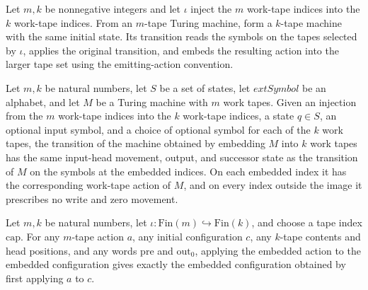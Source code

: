 \begin{definition}
\label{Turing.embedEmitTM}
\leanok
{}
Let $m,k$ be nonnegative integers and let $\iota$ inject the $m$ work-tape indices into
the $k$ work-tape indices. From an $m$-tape Turing machine, form a $k$-tape machine with
the same initial state. Its transition reads the symbols on the tapes selected by
$\iota$, applies the original transition, and embeds the resulting action into the
larger tape set using the emitting-action convention.
\end{definition}

\begin{theorem}
\label{Turing.embedEmitTM_tr}
\leanok
{}
Let $m,k$ be natural numbers, let $S$ be a set of states, let $	ext{Symbol}$ be an
alphabet, and let $M$ be a Turing machine with $m$ work tapes. Given an injection from
the $m$ work-tape indices into the $k$ work-tape indices, a state $q\in S$, an optional
input symbol, and a choice of optional symbol for each of the $k$ work tapes, the
transition of the machine obtained by embedding $M$ into $k$ work tapes has the same
input-head movement, output, and successor state as the transition of $M$ on the symbols
at the embedded indices. On each embedded index it has the corresponding work-tape
action of $M$, and on every index outside the image it prescribes no write and zero
movement.
\end{theorem}

\begin{lemma}
\label{Turing.embedSilent_apply}
\leanok
{}
Let $m,k$ be natural numbers, let $\iota:\mathrm{Fin}(m)\hookrightarrow\mathrm{Fin}(k)$,
and choose a tape index $\mathrm{cap}$. For any $m$-tape action $a$, any initial
configuration $c$, any $k$-tape contents and head positions, and any words
$\mathrm{pre}$ and $\mathrm{out}_0$, applying the embedded action to the embedded
configuration gives exactly the embedded configuration obtained by first applying $a$ to
$c$.
\end{lemma}

